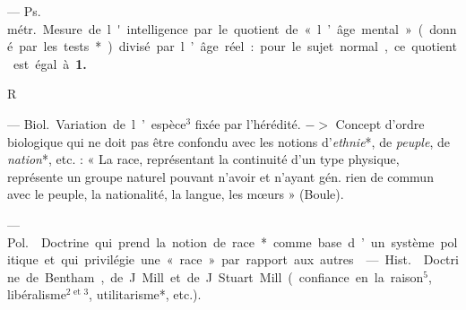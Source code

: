 \begin{itemize}[leftmargin=1cm, label=, itemsep=1pt]
 — \si{Ps. métr.} Mesure de l'intelligence par le
quotient de « l’âge mental » (donné par les tests*) divisé par l’âge réel :
pour le sujet normal, ce quotient est égal à {\bf 1.}

\begin{center}
R
\end{center}

 — \si{Biol.} Variation de l’espèce$^3$ fixée par l’hérédité. $->$
Concept d'ordre biologique qui ne doit pas être confondu avec les notions
d’{\it ethnie}*, de {\it peuple}, de {\it nation}*, etc. : « La race,
représentant la continuité d'un type physique, représente un groupe naturel
pouvant n’avoir et n'ayant gén. rien de commun avec le peuple, la
nationalité, la langue, les mœurs » (Boule).

 — \si{Pol.}  Doctrine qui prend la notion de
race* comme base d’un système politique et qui privilégie une « race » par
rapport aux autres.

 — \si{Hist.}  Doctrine de
Bentham, de J. Mill et de J. Stuart Mill (confiance en la raison$^5$,
libéralisme$^\text{2 et 3}$, utilitarisme*, etc.).


\end{itemize}
